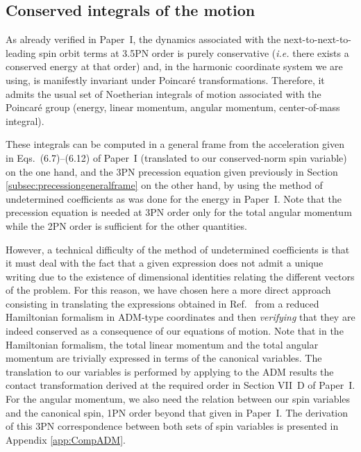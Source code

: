 \documentclass[
superscriptaddress,
preprint,
prd,tightenlines,showpacs,nofootinbib,
eqsecnum,
amsfonts,amsmath,amssymb]{revtex4-1}
\begin{document}
\subsection{Conserved integrals of the motion}

As already verified in Paper~I, the dynamics associated with the
next-to-next-to-leading spin orbit terms at 3.5PN order is purely
conservative (\textit{i.e.} there exists a conserved energy at that
order) and, in the harmonic coordinate system we are using, is
manifestly invariant under Poincar\'e transformations. Therefore, it
admits the usual set of Noetherian integrals of motion associated with
the Poincar\'e group (energy, linear momentum, angular momentum,
center-of-mass integral).

These integrals can be computed in a general frame from the
acceleration given in Eqs.~(6.7)--(6.12) of Paper~I (translated to our
conserved-norm spin variable) on the one hand, and the 3PN precession
equation given previously in Section
\ref{subsec:precessiongeneralframe} on the other hand, by using the
method of undetermined coefficients as was done for the energy in
Paper~I. Note that the precession equation is needed at 3PN order only
for the total angular momentum while the 2PN order is sufficient for
the other quantities.

However, a technical difficulty of the method of undetermined
coefficients is that it must deal with the fact that a given
expression does not admit a unique writing due to the existence of
dimensional identities relating the different vectors of the
problem. For this reason, we have chosen here a more direct approach
consisting in translating the expressions obtained in
Ref.~\cite{Hartung2011} from a reduced Hamiltonian formalism in
ADM-type coordinates and then \textit{verifying} that they are indeed
conserved as a consequence of our equations of motion. Note that in
the Hamiltonian formalism, the total linear momentum and the total angular
momentum are trivially expressed in terms of the canonical
variables. The translation to our variables is performed by applying
to the ADM results the contact transformation derived at the required
order in Section VII~D of Paper~I. For the angular momentum, we also
need the relation between our spin variables and the canonical spin,
1PN order beyond that given in Paper~I. The derivation of this 3PN
correspondence between both sets of spin variables is presented in
Appendix \ref{app:CompADM}.
\end{document}
